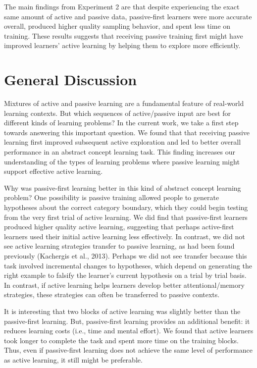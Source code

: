 \documentclass[10pt, letterpaper]{article}
\begin{document}
The main findings from Experiment 2 are that despite experiencing the
exact same amount of active and passive data, passive-first learners
were more accurate overall, produced higher quality sampling behavior,
and spent less time on training. These results suggests that receiving
passive training first might have improved learners' active learning by
helping them to explore more efficiently.

\section{General Discussion}\label{general-discussion}

Mixtures of active and passive learning are a fundamental feature of
real-world learning contexts. But which sequences of active/passive
input are best for different kinds of learning problems? In the current
work, we take a first step towards answering this important question. We
found that that receiving passive learning first improved subsequent
active exploration and led to better overall performance in an abstract
concept learning task. This finding increases our understanding of the
types of learning problems where passive learning might support
effective active learning.

Why was passive-first learning better in this kind of abstract concept
learning problem? One possibility is passive training allowed people to
generate hypotheses about the correct category boundary, which they
could begin testing from the very first trial of active learning. We did
find that passive-first learners produced higher quality active
learning, suggesting that perhaps active-first learners used their
initial active learning less effectively. In contrast, we did not see
active learning strategies transfer to passive learning, as had been
found previously (Kachergis et al., 2013). Perhaps we did not see
transfer because this task involved incremental changes to hypotheses,
which depend on generating the right example to falsify the learner's
current hypothesis on a trial by trial basis. In contrast, if active
learning helps learners develop better attentional/memory strategies,
these strategies can often be transferred to passive contexts.

It is interesting that two blocks of active learning was slightly better
than the passive-first learning. But, passive-first learning provides an
additional benefit: it reduces learning costs (i.e., time and mental
effort). We found that active learners took longer to complete the task
and spent more time on the training blocks. Thus, even if passive-first
learning does not achieve the same level of performance as active
learning, it still might be preferable.
\end{document}
